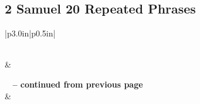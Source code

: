 \subsection{2 Samuel 20 Repeated Phrases}


\normalsize
 
\begin{center}
\begin{longtable}{|p{3.0in}|p{0.5in}|}
\caption[2 Samuel 20 Repeated Phrases]{2 Samuel 20 Repeated Phrases}\label{table:Repeated Phrases 2 Samuel 20} \\
\hline {} &  \\ \hline 
\endfirsthead
 
{{\bfseries \tablename\ \thetable{} -- continued from previous page}} \\  
\hline {} &  \\ \hline 
\endhead
 

\end{longtable}
\end{center}
